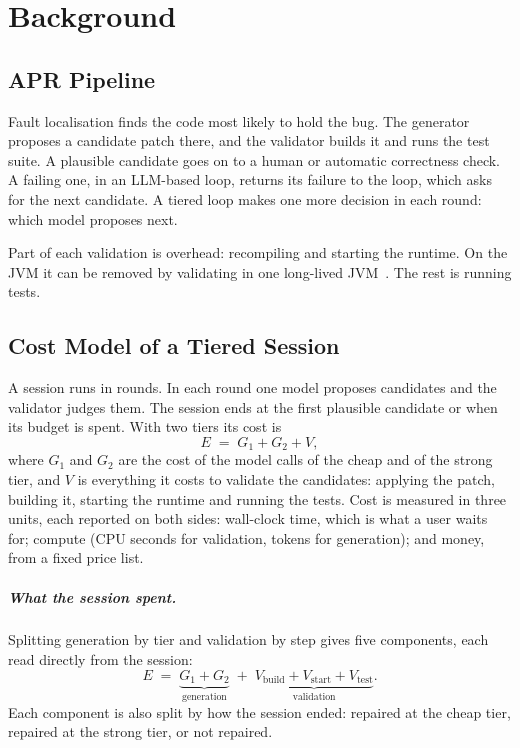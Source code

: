 \chapter{Background}
\label{ch:background}

\section{APR Pipeline}
\label{sec:bg-pipeline}

Fault localisation finds the code most likely to hold the bug. The generator
proposes a candidate patch there, and the validator builds it and runs the
test suite. A plausible candidate goes on to a human or automatic correctness
check. A failing one, in an LLM-based loop, returns its failure to the loop,
which asks for the next candidate. A tiered loop makes one more decision in
each round: which model proposes next.

Part of each validation is overhead: recompiling and starting the runtime. On
the JVM it can be removed by validating in one long-lived
JVM~\citep{chen2021uniapr,xiao2024expressapr}. The rest is running tests.

\section{Cost Model of a Tiered Session}
\label{sec:bg-cost}

A session runs in rounds. In each round one model proposes candidates and the
validator judges them. The session ends at the first plausible candidate or
when its budget is spent. With two tiers its cost is
\begin{equation}
E \;=\; G_1 + G_2 + V ,
\label{eq:bg-e2e}
\end{equation}
where $G_1$ and $G_2$ are the cost of the model calls of the cheap and of the
strong tier, and $V$ is everything it costs to validate the candidates:
applying the patch, building it, starting the runtime and running the tests.
Cost is measured in three units, each reported on both sides: wall-clock time,
which is what a user waits for; compute (CPU seconds for validation, tokens
for generation); and money, from a fixed price list.

\paragraph{What the session spent.} Splitting generation by tier and
validation by step gives five components, each read directly from the session:
\begin{equation}
E \;=\; \underbrace{G_1 + G_2}_{\text{generation}}
\;+\; \underbrace{V_{\mathrm{build}} + V_{\mathrm{start}} + V_{\mathrm{test}}}_{\text{validation}} .
\label{eq:bg-decomp}
\end{equation}
Each component is also split by how the session ended: repaired at the cheap
tier, repaired at the strong tier, or not repaired.

